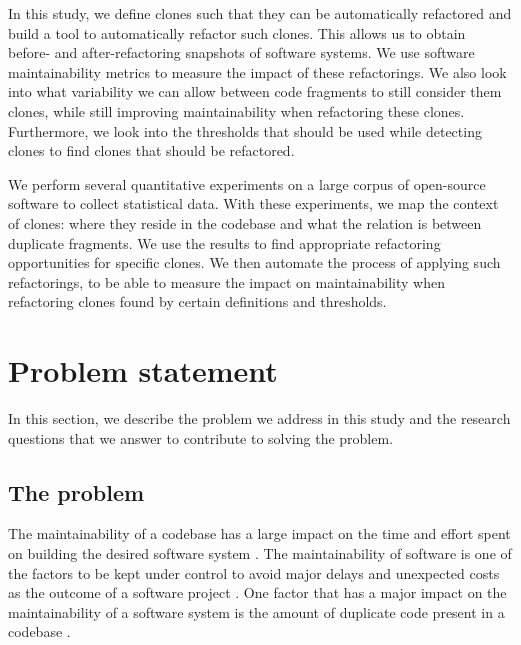 In this study, we define clones such that they can be automatically refactored and build a tool to automatically refactor such clones. This allows us to obtain before- and after-refactoring snapshots of software systems. We use software maintainability metrics to measure the impact of these refactorings. We also look into what variability we can allow between code fragments to still consider them clones, while still improving maintainability when refactoring these clones. Furthermore, we look into the thresholds that should be used while detecting clones to find clones that should be refactored.

We perform several quantitative experiments on a large corpus of open-source software to collect statistical data. With these experiments, we map the context of clones: where they reside in the codebase and what the relation is between duplicate fragments. We use the results to find appropriate refactoring opportunities for specific clones. We then automate the process of applying such refactorings, to be able to measure the impact on maintainability when refactoring clones found by certain definitions and thresholds.

\section{Problem statement}
In this section, we describe the problem we address in this study and the research questions that we answer to contribute to solving the problem.

\subsection{The problem}
The maintainability of a codebase has a large impact on the time and effort spent on building the desired software system \cite{bakota2012cost, munson1978software}. The maintainability of software is one of the factors to be kept under control to avoid major delays and unexpected costs as the outcome of a software project \cite{fowler2018refactoring}. One factor that has a major impact on the maintainability of a software system is the amount of duplicate code present in a codebase \cite{heitlager2007practical, fowler1999refactoring}.

